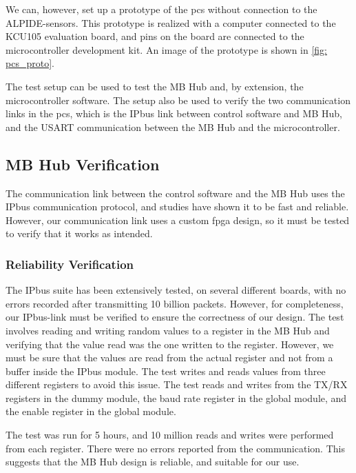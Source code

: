 \documentclass[main.tex]{subfiles}
\begin{document}
We can, however, set up a prototype of the \gls{pcs} without connection to the ALPIDE-sensors. This prototype is realized with a computer connected to the KCU105 evaluation board, and pins on the board are connected to the microcontroller development kit. An image of the prototype is shown in \autoref{fig: pcs_proto}.


The test setup can be used to test the MB Hub and, by extension, the microcontroller software. The setup also be used to verify the two communication links in the \gls{pcs}, which is the IPbus link between control software and MB Hub, and the USART communication between the MB Hub and the microcontroller.



\subsection{MB Hub Verification}

The communication link between the control software and the MB Hub uses the IPbus communication protocol, and studies have shown it to be fast and reliable\cite{IPbus}. However, our communication link uses a custom \gls{fpga} design, so it must be tested to verify that it works as intended.


\subsubsection{Reliability Verification}

The IPbus suite has been extensively tested, on several different boards, with no errors recorded after transmitting 10 billion packets\cite{IPbus}. However, for completeness, our IPbus-link must be verified to ensure the correctness of our design. The test involves reading and writing random values to a register in the MB Hub and verifying that the value read was the one written to the register. However, we must be sure that the values are read from the actual register and not from a buffer inside the IPbus module. The test writes and reads values from three different registers to avoid this issue. The test reads and writes from the TX/RX registers in the dummy module, the baud rate register in the global module, and the enable register in the global module.

The test was run for 5 hours, and 10 million reads and writes were performed from each register. There were no errors reported from the communication. This suggests that the MB Hub design is reliable, and suitable for our use.
\end{document}
